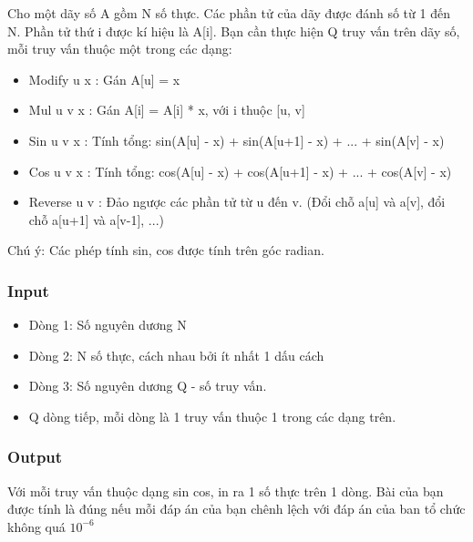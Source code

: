 



   Cho một dãy số A gồm N số thực. Các phần tử của dãy được đánh số từ 1 đến N. Phần tử thứ i được kí hiệu là A[i]. Bạn cần thực hiện Q truy vấn trên dãy số, mỗi truy vấn thuộc một trong các dạng:  
\begin{itemize}
	\item     Modify u x : Gán A[u] = x   
	\item     Mul u v x : Gán A[i] = A[i] * x, với i thuộc [u, v]   
	\item     Sin u v x : Tính tổng: sin(A[u] - x) + sin(A[u+1] - x) + ... + sin(A[v] - x)   
	\item     Cos u v x : Tính tổng: cos(A[u] - x) + cos(A[u+1] - x) + ... + cos(A[v] - x)   
	\item     Reverse u v : Đảo ngược các phần tử từ u đến v. (Đổi chỗ a[u] và a[v], đổi chỗ a[u+1] và a[v-1], ...)   
\end{itemize}

   Chú ý: Các phép tính sin, cos được tính trên góc radian.  

\subsubsection{   Input  }
\begin{itemize}
	\item     Dòng 1: Số nguyên dương N   
	\item     Dòng 2: N số thực, cách nhau bởi ít nhất 1 dấu cách   
	\item     Dòng 3: Số nguyên dương Q - số truy vấn.   
	\item     Q dòng tiếp, mỗi dòng là 1 truy vấn thuộc 1 trong các dạng trên.   
\end{itemize}

\subsubsection{   Output  }

   Với mỗi truy vấn thuộc dạng sin cos, in ra 1 số thực trên 1 dòng. Bài của bạn được tính là đúng nếu mỗi đáp án của bạn chênh lệch với đáp án của ban tổ chức không quá $10^{-6}$

